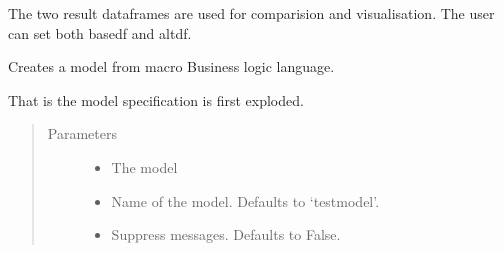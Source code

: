 \documentclass[letterpaper,10pt,english]{sphinxmanual}
\begin{document}
\begin{fulllineitems}
\begin{quote}
\begin{quote}
\begin{description}
\end{description}\end{quote}
\end{quote}

\sphinxAtStartPar
The two result dataframes are used for comparision and visualisation. The user can set both basedf and altdf.

\begin{fulllineitems}
\label{\detokenize{core/modelclass:modelclass.BaseModel.from_eq}}
\pysigstartsignatures
{}
\pysigstopsignatures
\sphinxAtStartPar
Creates a model from macro Business logic language.

\sphinxAtStartPar
That is the model specification is first exploded.
\begin{quote}\begin{description}
\item[{Parameters}] \leavevmode\begin{itemize}
\item {} 
\sphinxAtStartPar
{} \textendash{} The model

\item {} 
\sphinxAtStartPar
{} \textendash{} Name of the model. Defaults to ‘testmodel’.

\item {} 
\sphinxAtStartPar
{} \textendash{} Suppress messages. Defaults to False.


\end{itemize}
\end{description}
\end{quote}
\end{fulllineitems}
\end{fulllineitems}
\end{document}
